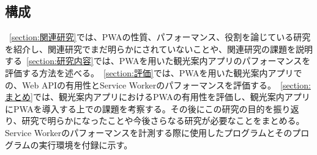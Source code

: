 \subsection{構成}
\label{subsection:構成}
~\autoref{section:関連研究}では、PWAの性質、パフォーマンス、役割を論じている研究を紹介し、関連研究でまだ明らかにされていないことや、関連研究の課題を説明する~\autoref{section:研究内容}では、PWAを用いた観光案内アプリのパフォーマンスを評価する方法を述べる。~\autoref{section:評価}では、PWAを用いた観光案内アプリでの、Web APIの有用性とService Workerのパフォーマンスを評価する。~\autoref{section:まとめ}では、観光案内アプリにおけるPWAの有用性を評価し、観光案内アプリにPWAを導入する上での課題を考察する。その後にこの研究の目的を振り返り、研究で明らかになったことや今後さらなる研究が必要なことをまとめる。Service Workerのパフォーマンスを計測する際に使用したプログラムとそのプログラムの実行環境を付録に示す。